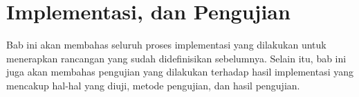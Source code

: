 \chapter{Implementasi, dan Pengujian}

Bab ini akan membahas seluruh proses implementasi yang dilakukan untuk menerapkan rancangan yang sudah didefinisikan sebelumnya. Selain itu, bab ini juga akan membahas pengujian yang dilakukan terhadap hasil implementasi yang mencakup hal-hal yang diuji, metode pengujian, dan hasil pengujian. 

%
%
%
